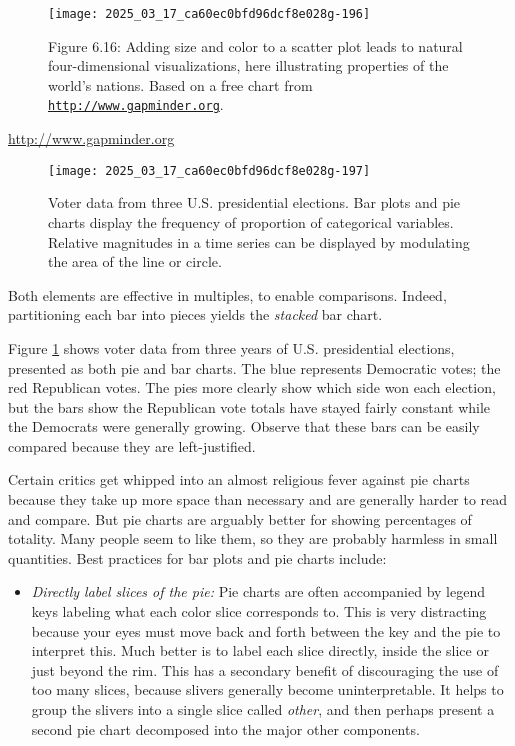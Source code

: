 \documentclass[10pt]{article}
\begin{document}
\begin{figure}[h!]
\centering
\texttt{[image: 2025\_03\_17\_ca60ec0bfd96dcf8e028g-196]}
\caption{Figure 6.16: Adding size and color to a scatter plot leads to natural four-dimensional visualizations, here illustrating properties of the world's nations. Based on a free chart from \href{http://www.gapminder.org}{\nolinkurl{http://www.gapminder.org}}.}
\end{figure}


\href{http://www.gapminder.org}{http://www.gapminder.org}
\begin{figure}[H]
    \centering
    \texttt{[image: 2025\_03\_17\_ca60ec0bfd96dcf8e028g-197]}
    \caption{Voter data from three U.S. presidential elections. Bar plots and pie charts display the frequency of proportion of categorical variables. Relative magnitudes in a time series can be displayed by modulating the area of the line or circle.}
    \label{fig:voter-data}
\end{figure}

Both elements are effective in multiples, to enable comparisons. Indeed, partitioning each bar into pieces yields the \textit{stacked} bar chart.

Figure \ref{fig:voter-data} shows voter data from three years of U.S. presidential elections, presented as both pie and bar charts. The blue represents Democratic votes; the red Republican votes. The pies more clearly show which side won each election, but the bars show the Republican vote totals have stayed fairly constant while the Democrats were generally growing. Observe that these bars can be easily compared because they are left-justified.

Certain critics get whipped into an almost religious fever against pie charts because they take up more space than necessary and are generally harder to read and compare. But pie charts are arguably better for showing percentages of totality. Many people seem to like them, so they are probably harmless in small quantities. Best practices for bar plots and pie charts include:

\begin{itemize}
    \item \textit{Directly label slices of the pie:} Pie charts are often accompanied by legend keys labeling what each color slice corresponds to. This is very distracting because your eyes must move back and forth between the key and the pie to interpret this. Much better is to label each slice directly, inside the slice or just beyond the rim. This has a secondary benefit of discouraging the use of too many slices, because slivers generally become uninterpretable. It helps to group the slivers into a single slice called \textit{other}, and then perhaps present a second pie chart decomposed into the major other components.
\end{itemize}
\end{document}
